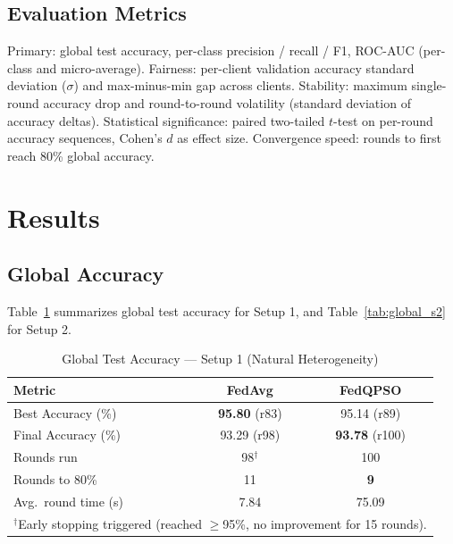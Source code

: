 \documentclass[conference]{IEEEtran}
\begin{document}
\subsection{Evaluation Metrics}
Primary: global test accuracy, per-class precision / recall / F1, ROC-AUC
(per-class and micro-average). Fairness: per-client validation accuracy
standard deviation ($\sigma$) and max-minus-min gap across clients. Stability:
maximum single-round accuracy drop and round-to-round volatility (standard
deviation of accuracy deltas). Statistical significance: paired two-tailed
$t$-test on per-round accuracy sequences, Cohen's $d$ as effect size.
Convergence speed: rounds to first reach 80\% global accuracy.

\section{Results}
\label{sec:results}

\subsection{Global Accuracy}

Table~\ref{tab:global_s1} summarizes global test accuracy for Setup 1, and
Table~\ref{tab:global_s2} for Setup 2.

\begin{table}[t]
\caption{Global Test Accuracy --- Setup 1 (Natural Heterogeneity)}
\label{tab:global_s1}
\begin{center}
\begin{tabular}{lcc}
\hline
\textbf{Metric} & \textbf{FedAvg} & \textbf{FedQPSO}\\
\hline
Best Accuracy (\%) & \textbf{95.80} (r83) & 95.14 (r89)\\
Final Accuracy (\%) & 93.29 (r98) & \textbf{93.78} (r100)\\
Rounds run & 98$^\dagger$ & 100\\
Rounds to 80\% & 11 & \textbf{9}\\
Avg.\ round time (s) & 7.84 & 75.09\\
\hline
\multicolumn{4}{l}{\small $^\dagger$Early stopping triggered (reached $\geq$95\%, no improvement for 15 rounds).}
\end{tabular}
\end{center}
\end{table}
\end{document}
